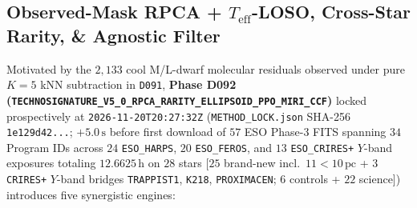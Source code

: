 \documentclass[twocolumn,10pt]{article}
\begin{document}
\subsection{Observed-Mask RPCA + $T_{\mathrm{eff}}$-LOSO, Cross-Star Rarity, \& Agnostic Filter}
Motivated by the $2{,}133$ cool M/L-dwarf molecular residuals observed under pure $K=5$ kNN subtraction in \texttt{D091}, \textbf{Phase D092 (\texttt{TECHNOSIGNATURE\_\allowbreak V5\_0\_\allowbreak RPCA\_\allowbreak RARITY\_\allowbreak ELLIPSOID\_\allowbreak PPO\_\allowbreak MIRI\_\allowbreak CCF})} locked prospectively at \texttt{2026-11-20T20:27:32Z} (\texttt{METHOD\_LOCK.json} SHA-256 \texttt{1e129d42...}; $+5.0\,\text{s}$ before first download of $57$ ESO Phase-3 FITS spanning $34$ Program IDs across $24$ \texttt{ESO\_HARPS}, $20$ \texttt{ESO\_FEROS}, and $13$ \texttt{ESO\_CRIRES+} $Y$-band exposures totaling $12.6625\,\text{h}$ on $28$ stars [$25$ brand-new incl.\ $11 < 10\,\text{pc}$ + $3$ \texttt{CRIRES+} $Y$-band bridges \texttt{TRAPPIST1}, \texttt{K218}, \texttt{PROXIMACEN}; $6$ controls + $22$ science]) introduces five synergistic engines:
\end{document}
